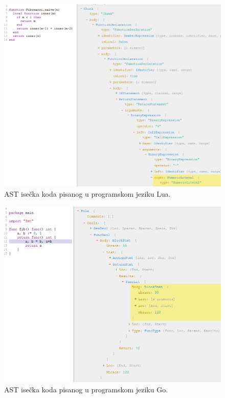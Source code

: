 \begin{figure}[h!]
\centering
\includegraphics[scale=0.6]{images/ast_lua.png}
\caption{AST isečka koda pisanog u programskom jeziku Lua.\protect\footnotemark}
\label{fig:ASTLua}
\end{figure}
\begin{figure}[h!]
\centering
\includegraphics[scale=0.65]{images/ast_go.png}
\caption{AST isečka koda pisanog u programskom jeziku Go.\protect\footnotemark}
\label{fig:ASTGo}
\end{figure}

